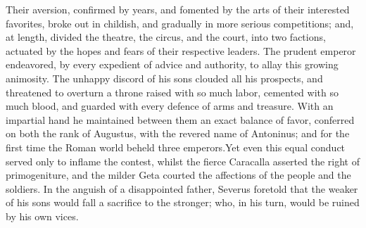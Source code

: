 Their aversion, confirmed by years, and fomented by the arts of
their interested favorites, broke out in childish, and gradually
in more serious competitions; and, at length, divided the
theatre, the circus, and the court, into two factions, actuated
by the hopes and fears of their respective leaders. The prudent
emperor endeavored, by every expedient of advice and authority,
to allay this growing animosity. The unhappy discord of his sons
clouded all his prospects, and threatened to overturn a throne
raised with so much labor, cemented with so much blood, and
guarded with every defence of arms and treasure. With an
impartial hand he maintained between them an exact balance of
favor, conferred on both the rank of Augustus, with the revered
name of Antoninus; and for the first time the Roman world beheld
three emperors.\footnotemark[10] Yet even this equal conduct served only to
inflame the contest, whilst the fierce Caracalla asserted the
right of primogeniture, and the milder Geta courted the
affections of the people and the soldiers. In the anguish of a
disappointed father, Severus foretold that the weaker of his sons
would fall a sacrifice to the stronger; who, in his turn, would
be ruined by his own vices.\footnotemark[11]



